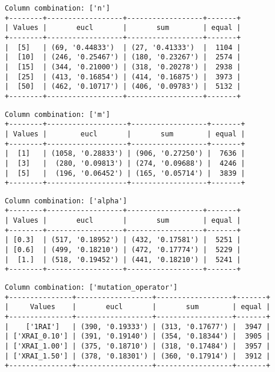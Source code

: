 \documentclass{article}
\begin{document}
\begin{verbatim}
Column combination: ['n']
+--------+------------------+------------------+-------+
| Values |       eucl       |       sum        | equal |
+--------+------------------+------------------+-------+
|  [5]   | (69, '0.44833')  | (27, '0.41333')  |  1104 |
|  [10]  | (246, '0.25467') | (180, '0.23267') |  2574 |
|  [15]  | (344, '0.21000') | (318, '0.20278') |  2938 |
|  [25]  | (413, '0.16854') | (414, '0.16875') |  3973 |
|  [50]  | (462, '0.10717') | (406, '0.09783') |  5132 |
+--------+------------------+------------------+-------+
\end{verbatim}

\begin{verbatim}
Column combination: ['m']
+--------+-------------------+------------------+-------+
| Values |        eucl       |       sum        | equal |
+--------+-------------------+------------------+-------+
|  [1]   | (1058, '0.28833') | (906, '0.27250') |  7636 |
|  [3]   |  (280, '0.09813') | (274, '0.09688') |  4246 |
|  [5]   |  (196, '0.06452') | (165, '0.05714') |  3839 |
+--------+-------------------+------------------+-------+
\end{verbatim}

\begin{verbatim}
Column combination: ['alpha']
+--------+------------------+------------------+-------+
| Values |       eucl       |       sum        | equal |
+--------+------------------+------------------+-------+
| [0.3]  | (517, '0.18952') | (432, '0.17581') |  5251 |
| [0.6]  | (499, '0.18210') | (472, '0.17774') |  5229 |
|  [1.]  | (518, '0.19452') | (441, '0.18210') |  5241 |
+--------+------------------+------------------+-------+
\end{verbatim}

\begin{verbatim}
Column combination: ['mutation_operator']
+---------------+------------------+------------------+-------+
|     Values    |       eucl       |       sum        | equal |
+---------------+------------------+------------------+-------+
|    ['1RAI']   | (390, '0.19333') | (313, '0.17677') |  3947 |
| ['XRAI_0.10'] | (391, '0.19140') | (354, '0.18344') |  3905 |
| ['XRAI_1.00'] | (375, '0.18710') | (318, '0.17484') |  3957 |
| ['XRAI_1.50'] | (378, '0.18301') | (360, '0.17914') |  3912 |
+---------------+------------------+------------------+-------+
\end{verbatim}
\end{document}
